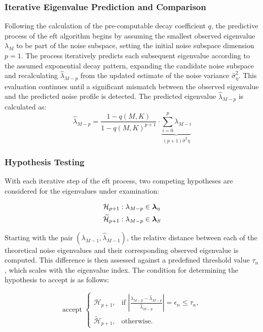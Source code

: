 \subsubsection*{Iterative Eigenvalue Prediction and Comparison}
Following the calculation of the pre-computable decay coefficient \( q \), the predictive process of the \gls{eft} algorithm
begins by assuming the smallest observed eigenvalue \( \lambda_M \) to be part of the noise subspace,
setting the initial noise subspace dimension \(  p= 1 \). The process iteratively predicts each subsequent
eigenvalue according to the assumed exponential decay pattern, expanding the candidate noise subspace and recalculating
\( \hat{\lambda}_{M-p} \) from the updated estimate of the noise variance \( \widehat{\sigma}^2_{\eta} \).
This evaluation continues until a significant mismatch between the observed eigenvalue and the predicted noise profile is detected.
The predicted eigenvalue \( \hat{\lambda}_{M-p} \) is calculated as:
\begin{equation}
    \hat{\lambda}_{M-p} = \frac{1 - q(M, K)}{1 - {q(M, K)}^{p + 1}} \cdot \underbrace{\sum_{i=0}^{p}\lambda_{M-i}}_{(p+1)\widehat{\sigma}^2\eta}
    \label{eq:eft_predicted_eigenvalue}
\end{equation}


\subsubsection*{Hypothesis Testing}

With each iterative step of the \gls{eft} process, two competing hypotheses are considered for the eigenvalues under
examination:

\begin{align}
    \mathcal{H}_{p+1} &: \lambda_{M-p} \in \boldsymbol{\lambda}_\eta \label{eq:hypothesis_noise} \\
    \widetilde{\mathcal{H}}_{p+1} &: \lambda_{M-p} \in \boldsymbol{\lambda}_S \label{eq:hypothesis_signal}
\end{align}

Starting with the pair \( (\lambda_{M-1}, \hat{\lambda}_{M-1}) \), the relative distance between each of the
theoretical noise eigenvalues and their corresponding observed eigenvalue is computed. This difference is then assessed
against a predefined threshold value \( \tau_n \), which scales with the eigenvalue index. The condition for
determining the hypothesis to accept is as follows:

\begin{equation}
    \text{accept } \left\{
        \begin{array}{ll}
            \mathcal{H}_{p+1}, & \text{if } \left|\frac{\lambda_{M-p} - \hat{\lambda}_{M-p}}{\hat{\lambda}_{M-p}}\right| = \epsilon_n \leq \tau_n, \\
            \widetilde{\mathcal{H}}_{p+1}, & \text{otherwise}.
        \end{array}
    \right.
    \label{eq:threshold_condition}
\end{equation}



